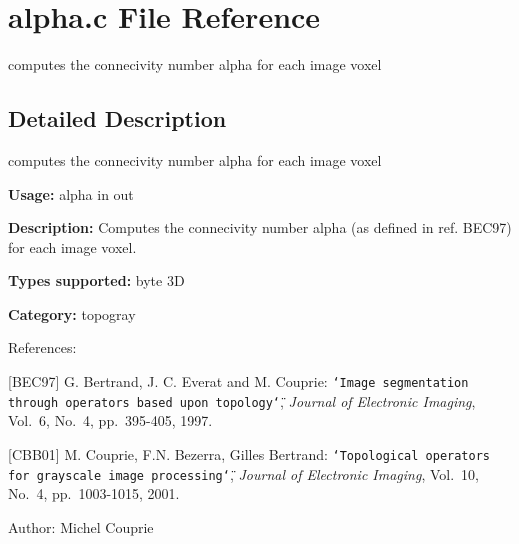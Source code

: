 \section{alpha.c File Reference}
\label{alpha_8c}
computes the connecivity number alpha for each image voxel 



\subsection{Detailed Description}
computes the connecivity number alpha for each image voxel 

{\bf Usage:} alpha in out

{\bf Description:} Computes the connecivity number alpha (as defined in ref. BEC97) for each image voxel.

{\bf Types supported:} byte 3D

{\bf Category:} topogray

References:

[BEC97] G. Bertrand, J. C. Everat and M. Couprie: {\tt \char`\"{}Image segmentation through operators based upon topology\char`\"{}}, {\em  Journal of Electronic Imaging\/}, Vol.~6, No.~4, pp.~395-405, 1997.

[CBB01] M. Couprie, F.N. Bezerra, Gilles Bertrand: {\tt \char`\"{}Topological operators for grayscale image processing\char`\"{}}, {\em  Journal of Electronic Imaging\/}, Vol.~10, No.~4, pp.~1003-1015, 2001.

\begin{Desc}
\item[Author:]Michel Couprie \end{Desc}

